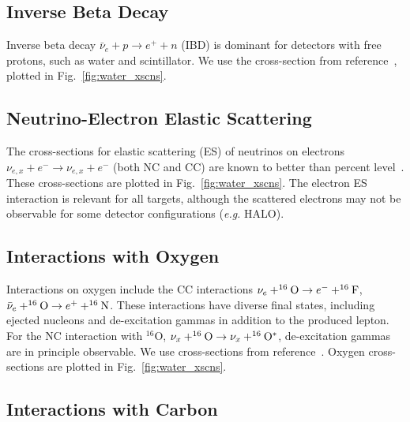 \documentclass{article}
\begin{document}
\subsection{Inverse Beta Decay}

Inverse beta decay $\bar{\nu}_e+ p \rightarrow e^+ + n$ (IBD) is dominant for detectors with free protons, such as water and scintillator. We use the cross-section from reference~\cite{strumia:2003zx}, plotted in Fig.~\ref{fig:water_xscns}.

\subsection{Neutrino-Electron Elastic Scattering}\label{subsec:nu-e-elastic}

The cross-sections for elastic scattering (ES) of neutrinos on electrons $\nu_{e,x} + e^- \rightarrow \nu_{e,x} + e^-$ (both NC and CC) are known to better than percent level~\cite{Marciano:2003eq}. These cross-sections are plotted in Fig.~\ref{fig:water_xscns}. The electron ES interaction is relevant for all targets, although the scattered electrons may not be observable for some detector configurations (\textit{e.g.} HALO).

\subsection{Interactions with Oxygen}

Interactions on oxygen include the CC interactions $\nu_e+^{16}{\rm
  O}\rightarrow e^-+^{16}{\rm F}$, $\bar{\nu}_e+^{16}{\rm O}
\rightarrow e^++^{16}{\rm N}$.
These interactions have diverse final states, including
ejected nucleons and de-excitation gammas in addition to the produced
lepton.  For the NC interaction with $^{16}$O, $\nu_x+^{16}{\rm O}
\rightarrow \nu_x+ ^{16}{\rm O}^*$, de-excitation gammas are in principle
observable.  We use cross-sections from reference~\cite{Kolbe:2002gk}.
Oxygen cross-sections are plotted in Fig.~\ref{fig:water_xscns}.

\subsection{Interactions with Carbon}
\end{document}
